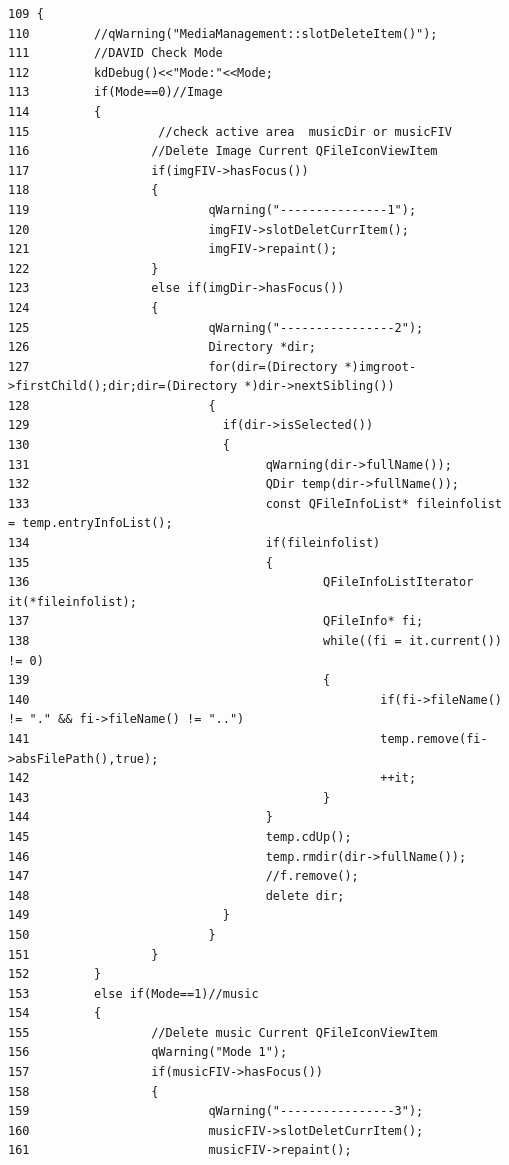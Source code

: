 \footnotesize\begin{verbatim}109 {
110         //qWarning("MediaManagement::slotDeleteItem()");
111         //DAVID Check Mode
112         kdDebug()<<"Mode:"<<Mode;
113         if(Mode==0)//Image
114         {
115                  //check active area  musicDir or musicFIV
116                 //Delete Image Current QFileIconViewItem
117                 if(imgFIV->hasFocus())
118                 {
119                         qWarning("---------------1");
120                         imgFIV->slotDeletCurrItem();
121                         imgFIV->repaint();
122                 }
123                 else if(imgDir->hasFocus())
124                 {
125                         qWarning("----------------2");
126                         Directory *dir;
127                         for(dir=(Directory *)imgroot->firstChild();dir;dir=(Directory *)dir->nextSibling())
128                         {
129                           if(dir->isSelected())
130                           {
131                                 qWarning(dir->fullName());
132                                 QDir temp(dir->fullName());
133                                 const QFileInfoList* fileinfolist = temp.entryInfoList();
134                                 if(fileinfolist) 
135                                 {
136                                         QFileInfoListIterator it(*fileinfolist);
137                                         QFileInfo* fi;
138                                         while((fi = it.current()) != 0)
139                                         {
140                                                 if(fi->fileName() != "." && fi->fileName() != "..") 
141                                                 temp.remove(fi->absFilePath(),true);
142                                                 ++it;
143                                         }
144                                 }       
145                                 temp.cdUp();
146                                 temp.rmdir(dir->fullName());
147                                 //f.remove();
148                                 delete dir;
149                           }
150                         }
151                 }
152         }
153         else if(Mode==1)//music
154         {
155                 //Delete music Current QFileIconViewItem
156                 qWarning("Mode 1");
157                 if(musicFIV->hasFocus())
158                 {
159                         qWarning("----------------3");
160                         musicFIV->slotDeletCurrItem();
161                         musicFIV->repaint();

\end{verbatim}
